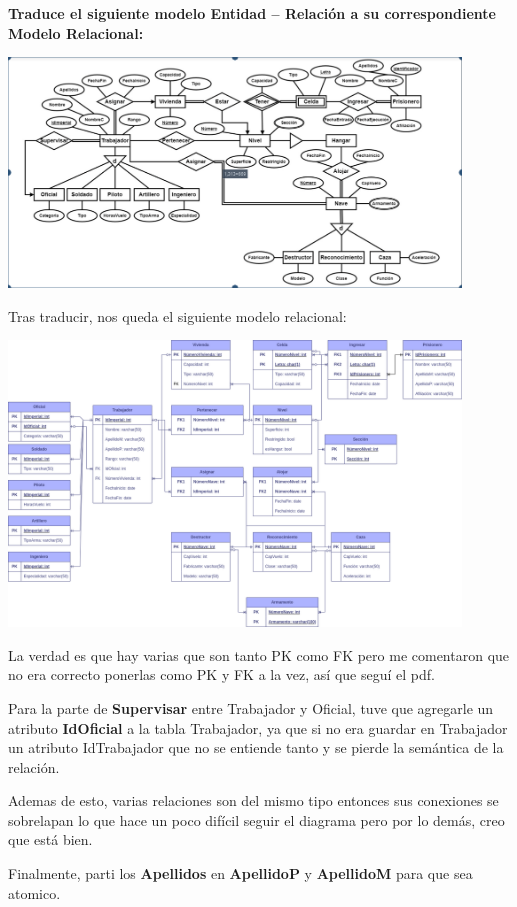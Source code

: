 \textbf{Traduce el siguiente modelo Entidad – Relación a su correspondiente Modelo Relacional:}\vspace{.3cm}

\begin{center}
    \includegraphics[width=12cm]{conversion/../resources/a.png}
\end{center}

Tras traducir, nos queda el siguiente modelo relacional:\vspace{.3cm}
\begin{center}
    \includegraphics[width=12cm]{conversion/../resources/Tarea3.2.a.png}
\end{center}

La verdad es que hay varias que son tanto PK como FK pero me comentaron que
no era correcto ponerlas como PK y FK a la vez, así que seguí el pdf. \vspace{.2cm}

Para la parte de \textbf{Supervisar} entre Trabajador y Oficial, tuve que agregarle un
atributo \textbf{IdOficial} a la tabla Trabajador, ya que si no era guardar en Trabajador
un atributo IdTrabajador que no se entiende tanto y se pierde la semántica de la relación.\vspace{.2cm}

Ademas de esto, varias relaciones son del mismo tipo entonces sus conexiones se sobrelapan
lo que hace un poco difícil seguir el diagrama pero por lo demás, creo que está bien.\vspace{.2cm}

Finalmente, parti los \textbf{Apellidos} en \textbf{ApellidoP} y \textbf{ApellidoM} para que sea atomico.\vspace{.4cm}